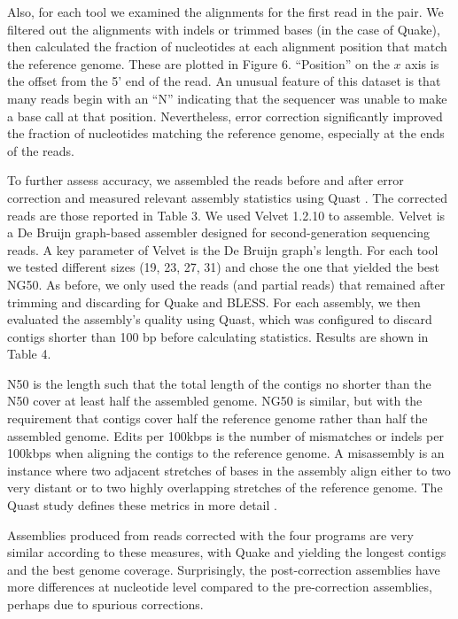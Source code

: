 \documentclass{bmcart}
\begin{document}

Also, for each tool we examined the alignments for the first read in the pair.  We filtered out the alignments with indels or trimmed bases (in the case of Quake), then calculated the fraction of nucleotides at each alignment position that match the reference genome.  These are plotted in Figure 6. ``Position'' on the $x$ axis is the offset from the 5' end of the read.  An unusual feature of this dataset is that many reads begin with an ``N'' indicating that the sequencer was unable to make a base call at that position. Nevertheless, error correction significantly improved the fraction of nucleotides matching the reference genome, especially at the ends of the reads.



To further assess accuracy, we assembled the reads before and after error correction and measured relevant assembly statistics using Quast \cite{gurevich2013quast}.  The corrected reads are those reported in Table 3. We used Velvet 1.2.10\cite{zerbino2008velvet} to assemble.  Velvet is a De Bruijn graph-based assembler designed for second-generation sequencing reads.  A key parameter of Velvet is the De Bruijn graph's \kmer length.  For each tool we tested different \kmer sizes (19, 23, 27, 31) and chose the one that yielded the best NG50.  As before, we only used the reads (and partial reads) that remained after trimming and discarding for Quake and BLESS.  For each assembly, we then evaluated the assembly's quality using Quast, which was configured to discard contigs shorter than 100 bp before calculating statistics. Results are shown in Table 4.


N50 is the length such that the total length of the contigs no shorter than the N50 cover at least half the assembled genome.  NG50 is similar, but with the requirement that contigs cover half the reference genome rather than half the assembled genome. Edits per 100kbps is the number of mismatches or indels per 100kbps when aligning the contigs to the reference genome. A misassembly is an instance where two adjacent stretches of bases in the assembly align either to two very distant or to two highly overlapping stretches of the reference genome.  The Quast study defines these metrics in more detail \cite{gurevich2013quast}.

Assemblies produced from reads corrected with the four programs are very similar according to these measures, with Quake and \tool yielding the longest contigs and the best genome coverage. Surprisingly, the post-correction assemblies have more differences at nucleotide level compared to the pre-correction assemblies, perhaps due to spurious corrections.
\end{document}
